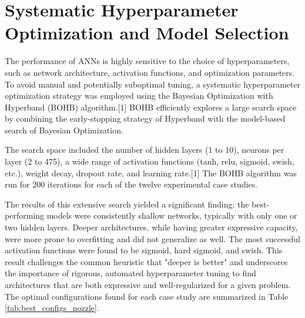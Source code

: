 \documentclass[12pt, a4paper]{report}
\begin{document}
\section{Systematic Hyperparameter Optimization and Model Selection}

The performance of ANNs is highly sensitive to the choice of hyperparameters, such as network architecture, activation functions, and optimization parameters. To avoid manual and potentially suboptimal tuning, a systematic hyperparameter optimization strategy was employed using the Bayesian Optimization with Hyperband (BOHB) algorithm.[1] BOHB efficiently explores a large search space by combining the early-stopping strategy of Hyperband with the model-based search of Bayesian Optimization.

The search space included the number of hidden layers (1 to 10), neurons per layer (2 to 475), a wide range of activation functions (tanh, relu, sigmoid, swish, etc.), weight decay, dropout rate, and learning rate.[1] The BOHB algorithm was run for 200 iterations for each of the twelve experimental case studies.

The results of this extensive search yielded a significant finding: the best-performing models were consistently shallow networks, typically with only one or two hidden layers. Deeper architectures, while having greater expressive capacity, were more prone to overfitting and did not generalize as well. The most successful activation functions were found to be sigmoid, hard sigmoid, and swish. This result challenges the common heuristic that "deeper is better" and underscores the importance of rigorous, automated hyperparameter tuning to find architectures that are both expressive and well-regularized for a given problem. The optimal configurations found for each case study are summarized in Table \ref{tab:best_configs_nozzle}.
\end{document}
